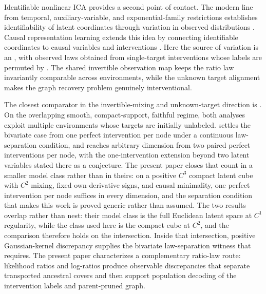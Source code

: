 \documentclass[11pt]{article}
\begin{document}
Identifiable nonlinear ICA provides a second point of contact. The modern line from temporal, auxiliary-variable, and exponential-family restrictions establishes identifiability of latent coordinates through variation in observed distributions \citep{Hyvarinen2001,Hyvarinen2016,Hyvarinen2019,Khemakhem2020,Hyvarinen2023}. Causal representation learning extends this idea by connecting identifiable coordinates to causal variables and interventions \citep{Brehmer2022,Lippe2022,Squires2022,Zhang2023}. Here the source of variation is an  , with observed laws  obtained from single-target interventions whose labels are permuted by . The shared invertible observation map keeps the ratio law invariantly comparable across environments, while the unknown target alignment makes the graph recovery problem genuinely interventional.

The closest comparator in the invertible-mixing and unknown-target direction is \citet{vonKugelgenEtAl2023UnknownInterventions}. On the overlapping smooth, compact-support, faithful regime, both analyses exploit multiple environments whose targets are initially unlabeled. \citet[Theorem~3.2]{vonKugelgenEtAl2023UnknownInterventions} settles the bivariate case from one perfect intervention per node under a continuous law-separation condition, and \citet[Theorem~3.4]{vonKugelgenEtAl2023UnknownInterventions} reaches arbitrary dimension from two paired perfect interventions per node, with the one-intervention extension beyond two latent variables stated there as a conjecture. The present paper closes that count in a smaller model class rather than in theirs: on a positive \(C^3\) compact latent cube with \(C^2\) mixing, fixed own-derivative signs, and causal minimality, one perfect intervention per node suffices in every dimension, and the separation condition that makes this work is proved generic rather than assumed. The two results overlap rather than nest: their model class is the full Euclidean latent space at \(C^1\) regularity, while the class used here is the compact cube at \(C^2\), and the comparison therefore holds on the intersection. Inside that intersection, positive Gaussian-kernel discrepancy supplies the bivariate law-separation witness that \citet[Theorem~3.2]{vonKugelgenEtAl2023UnknownInterventions} requires. The present paper characterizes a complementary ratio-law route: likelihood ratios  and log-ratios  produce observable discrepancies that separate transported ancestral covers and then support population decoding of the intervention labels and parent-pruned graph.
\end{document}
